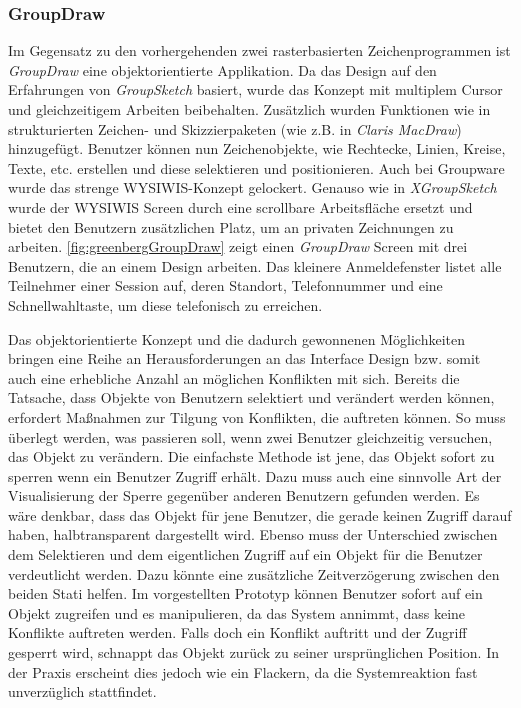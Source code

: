 \subsubsection{GroupDraw} 
Im Gegensatz zu den vorhergehenden zwei rasterbasierten Zeichenprogrammen ist \emph{GroupDraw} eine objektorientierte Applikation. Da das Design auf den Erfahrungen von \emph{GroupSketch} basiert, wurde das Konzept mit multiplem Cursor und gleichzeitigem Arbeiten beibehalten. Zusätzlich wurden Funktionen wie in strukturierten Zeichen- und Skizzierpaketen (wie z.B. in \emph{Claris MacDraw}) hinzugefügt. Benutzer können nun Zeichenobjekte, wie Rechtecke, Linien, Kreise, Texte, etc. erstellen und diese selektieren und positionieren. Auch bei Groupware wurde das strenge WYSIWIS-Konzept gelockert. Genauso wie in \emph{XGroupSketch} wurde der WYSIWIS Screen durch eine scrollbare Arbeitsfläche ersetzt und bietet den Benutzern zusätzlichen Platz, um an privaten Zeichnungen zu arbeiten. \autoref{fig:greenbergGroupDraw} zeigt einen \emph{GroupDraw} Screen mit drei Benutzern, die an einem Design arbeiten. Das kleinere Anmeldefenster listet alle Teilnehmer einer Session auf, deren Standort, Telefonnummer und eine Schnellwahltaste, um diese telefonisch zu erreichen.

\medskip Das objektorientierte Konzept und die dadurch gewonnenen Möglichkeiten bringen eine Reihe an Herausforderungen an das Interface Design bzw. somit auch eine erhebliche Anzahl an möglichen Konflikten mit sich. Bereits die Tatsache, dass Objekte von Benutzern selektiert und verändert werden können, erfordert Maßnahmen zur Tilgung von Konflikten, die auftreten können. So muss überlegt werden, was passieren soll, wenn zwei Benutzer gleichzeitig versuchen, das Objekt zu verändern. Die einfachste Methode ist jene, das Objekt sofort zu sperren wenn ein Benutzer Zugriff erhält.  
Dazu muss auch eine sinnvolle Art der Visualisierung der Sperre gegenüber anderen Benutzern gefunden werden. Es wäre denkbar, dass das Objekt für jene Benutzer, die gerade keinen Zugriff darauf haben, halbtransparent dargestellt wird. Ebenso muss der Unterschied zwischen dem Selektieren und dem eigentlichen Zugriff auf ein Objekt für die Benutzer verdeutlicht werden. Dazu könnte eine zusätzliche Zeitverzögerung zwischen den beiden Stati helfen. Im vorgestellten Prototyp können Benutzer sofort auf ein Objekt zugreifen und es manipulieren, da das System annimmt, dass keine Konflikte auftreten werden. Falls doch ein Konflikt auftritt und der Zugriff gesperrt wird, schnappt das Objekt zurück zu seiner ursprünglichen Position. In der Praxis erscheint dies jedoch wie ein Flackern, da die Systemreaktion fast unverzüglich stattfindet. 

